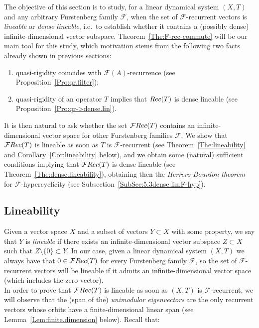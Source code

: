 \documentclass[openright,11pt]{article}
\theoremstyle{plain}
\theoremstyle{definition}
\newcommand{\Fc}{\mathcal{F}}
\newcommand{\Rec}{\textup{Rec}}
\begin{document}
The objective of this section is to study, for a linear dynamical system $(X,T)$ and any arbitrary Furstenberg family $\Fc$, when the set of $\Fc$-recurrent vectors is {\em lineable} or {\em dense lineable}, i.e.\ to establish whether it contains a (possibly dense) infinite-dimensional vector subspace. Theorem~\ref{The:F-rec-commute} will be our main tool for this study, which motivation stems from the following two facts already shown in previous sections:
\begin{enumerate}[--]
	\item quasi-rigidity coincides with $\Fc(A)$-recurrence (see Proposition~\ref{Pro:qr.filter});
	
	\item quasi-rigidity of an operator $T$ implies that $\Rec(T)$ is dense lineable (see Proposition~\ref{Pro:qr->dense.lin}).
\end{enumerate}
It is then natural to ask whether the set $\Fc\Rec(T)$ contains an infinite-dimensional vector space for other Furstenberg families $\Fc$. We show that $\Fc\Rec(T)$ is lineable as soon as $T$ is $\Fc$-recurrent (see Theorem~\ref{The:lineability} and Corollary~\ref{Cor:lineability} below), and we obtain some (natural) sufficient conditions implying that $\Fc\Rec(T)$ is dense lineable (see Theorem~\ref{The:dense.lineability}), obtaining then the {\em Herrero-Bourdon theorem} for $\Fc$-hypercyclicity (see Subsection~\ref{SubSec:5.3dense.lin.F-hyp}).

\subsection{Lineability}

Given a vector space $X$ and a subset of vectors $Y \subset X$ with some property, we say that $Y$ is {\em lineable} if there exists an infinite-dimensional vector subspace $Z \subset X$ such that $Z\setminus\{0\} \subset Y$. In our case, given a linear dynamical system $(X,T)$ we always have that $0 \in \Fc\Rec(T)$ for every Furstenberg family $\Fc$, so the set of $\Fc$-recurrent vectors will be lineable if it admits an infinite-dimensional vector space (which includes the zero-vector).\\[-5pt]

In order to prove that $\Fc\Rec(T)$ is lineable as soon as $(X,T)$ is $\Fc$-recurrent, we will observe that the (span of the) {\em unimodular eigenvectors} are the only recurrent vectors whose orbits have a finite-dimensional linear span (see Lemma~\ref{Lem:finite.dimension} below). Recall that:
\end{document}
